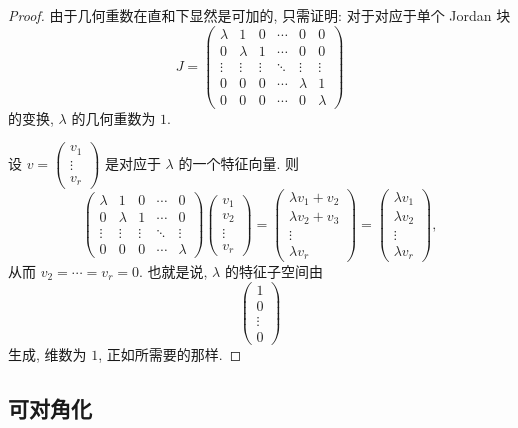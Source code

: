 \begin{proof}
由于几何重数在直和下显然是可加的, 只需证明: 对于对应于单个 Jordan 块
\[
J=\begin{pmatrix}
\lambda&1&0&\cdots&0&0\\
0&\lambda&1&\cdots&0&0\\
\vdots&\vdots&\vdots&\ddots&\vdots&\vdots\\
0&0&0&\cdots&\lambda&1\\
0&0&0&\cdots&0&\lambda
\end{pmatrix}
\]
的变换, $\lambda$ 的几何重数为 $1$.

设 $v=\begin{pmatrix}v_1\\ \vdots\\ v_r\end{pmatrix}$ 是对应于 $\lambda$ 的一个特征向量. 则
\[
\begin{pmatrix}
\lambda&1&0&\cdots&0\\
0&\lambda&1&\cdots&0\\
\vdots&\vdots&\vdots&\ddots&\vdots\\
0&0&0&\cdots&\lambda
\end{pmatrix}
\begin{pmatrix}v_1\\ v_2\\ \vdots\\ v_r\end{pmatrix}
=
\begin{pmatrix}\lambda v_1+v_2\\ \lambda v_2+v_3\\ \vdots\\ \lambda v_r\end{pmatrix}
=
\begin{pmatrix}\lambda v_1\\ \lambda v_2\\ \vdots\\ \lambda v_r\end{pmatrix},
\]
从而 $v_2=\cdots=v_r=0$. 也就是说, $\lambda$ 的特征子空间由
\[
\begin{pmatrix}1\\0\\ \vdots\\ 0\end{pmatrix}
\]
生成, 维数为 $1$, 正如所需要的那样.
\end{proof}

\subsection{可对角化}
\label{subsec:diagonalizable}

